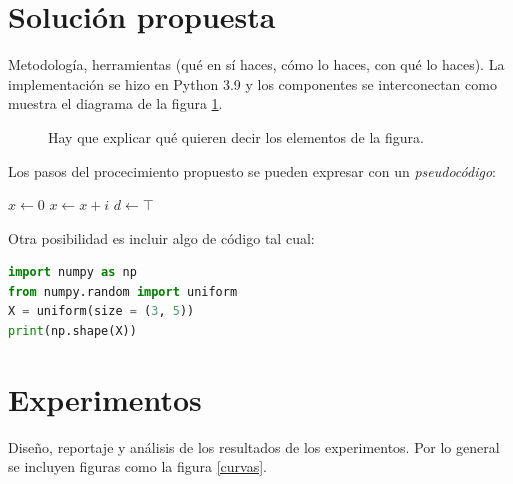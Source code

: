 \documentclass{sciposter}
\begin{document}
\begin{multicols}{2}
\section{Solución propuesta}

Metodología, herramientas (qué en sí haces, cómo lo haces, con qué lo haces).
La implementación se hizo en Python 3.9 \citep{python} y los componentes se interconectan como muestra el diagrama de la figura \ref{diag}.

\begin{figure}
\captionsetup{type=figure} %
\setcounter{figure}{0} %
\begin{center}
\end{center}
\caption{Hay que explicar qué quieren decir los elementos de la figura.}
\label{diag}
\end{figure}

Los pasos del procecimiento propuesto se pueden expresar con un {\em pseudocódigo}:

\begin{algorithmic}[1]
\State $x \leftarrow 0$
	\State $x \leftarrow x + i$
\EndFor
{}
    \State $d \leftarrow \top$
\EndIf
\end{algorithmic} 

Otra posibilidad es incluir algo de código tal cual:
\begin{lstlisting}[language=Python, caption=Procedimiento del segundo paso]
import numpy as np
from numpy.random import uniform
X = uniform(size = (3, 5))
print(np.shape(X))
\end{lstlisting}

\section{Experimentos}

Diseño, reportaje y análisis de los resultados de los experimentos. Por lo general se incluyen figuras como la figura \ref{curvas}.


\end{multicols}
\end{document}

